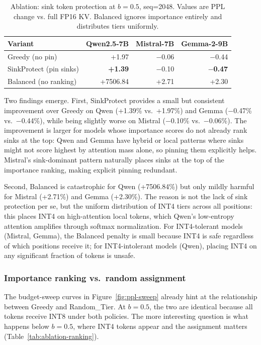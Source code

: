 \documentclass[11pt]{article}
\newcommand{\budget}{b}
\newcommand{\pct}{\%}
\theoremstyle{plain}
\theoremstyle{definition}
\begin{document}
\begin{table}[t]
\centering
\caption{Ablation: sink token protection at $\budget=0.5$, seq=2048.  Values are PPL change vs. full FP16 KV.  Balanced ignores importance entirely and distributes tiers uniformly.}
\label{tab:ablation-sink}
\small
\begin{tabular}{lrrr}
\toprule
Variant & Qwen2.5-7B & Mistral-7B & Gemma-2-9B \\
\midrule
Greedy (no pin) & +1.97 & $-$0.06 & $-$0.44 \\
SinkProtect (pin sinks) & \textbf{+1.39} & $-$0.10 & \textbf{$-$0.47} \\
Balanced (no ranking) & +7506.84 & +2.71 & +2.30 \\
\bottomrule
\end{tabular}
\end{table}

Two findings emerge.  First, SinkProtect provides a small but consistent improvement over Greedy on Qwen (+1.39\pct{} vs.\ +1.97\pct{}) and Gemma ($-$0.47\pct{} vs.\ $-$0.44\pct{}), while being slightly worse on Mistral ($-$0.10\pct{} vs.\ $-$0.06\pct{}).  The improvement is larger for models whose importance scores do not already rank sinks at the top: Qwen and Gemma have hybrid or local patterns where sinks might not score highest by attention mass alone, so pinning them explicitly helps.  Mistral's sink-dominant pattern naturally places sinks at the top of the importance ranking, making explicit pinning redundant.

Second, Balanced is catastrophic for Qwen (+7506.84\pct{}) but only mildly harmful for Mistral (+2.71\pct{}) and Gemma (+2.30\pct{}).  The reason is not the lack of sink protection per se, but the uniform distribution of INT4 tiers across all positions: this places INT4 on high-attention local tokens, which Qwen's low-entropy attention amplifies through softmax normalization.  For INT4-tolerant models (Mistral, Gemma), the Balanced penalty is small because INT4 is safe regardless of which positions receive it; for INT4-intolerant models (Qwen), placing INT4 on any significant fraction of tokens is unsafe.

\subsubsection{Importance ranking vs.\ random assignment}
\label{sec:ablation-ranking}

The budget-sweep curves in Figure~\ref{fig:ppl-sweep} already hint at the relationship between Greedy and Random\_Tier.  At $\budget=0.5$, the two are identical because all tokens receive INT8 under both policies.  The more interesting question is what happens below $\budget=0.5$, where INT4 tokens appear and the assignment matters (Table~\ref{tab:ablation-ranking}).
\end{document}
